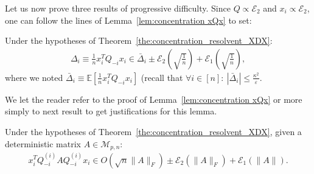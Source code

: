 \documentclass[a4papaer, titlepage]{book}
\begin{document}
Let us now prove three results of progressive difficulty.
Since $Q \propto \mathcal E_2$ and $x_i \propto \mathcal E_2$, one can follow the lines of Lemma~\ref{lem:concentration xQx} to set:
\begin{lemma}\label{lem:COncentration_xQy}
   Under the hypotheses of Theorem~\ref{the:concentration_resolvent_XDX}:
   \begin{align*}
     \Delta_i \equiv \frac{1}{n}x_i^TQ_{-i}x_i  \in \bar \Delta_i   \pm 
     \mathcal E_2 \left(\sqrt{\frac{1}{n}}\right) + \mathcal E_1 \left(\sqrt{\frac{1}{n}}\right),
   \end{align*}
   where we noted $\bar \Delta_i \equiv \mathbb E[\frac{1}{n}x_i^TQ_{-i}x_i]$ (recall that $\forall i\in[n]: \ |\bar \Delta_i| \leq \frac{\kappa^2}{\varepsilon}$.
 \end{lemma}
 We let the reader refer to the proof of Lemma~\ref{lem:concentration xQx} or more simply to next result to get justifications for this lemma.
\begin{lemma}\label{lem:concentration_xiQAQyi}
Under the hypotheses of Theorem~\ref{the:concentration_resolvent_XDX}, given a deterministic matrix $A \in \mathcal M_{p,n}$:
  \begin{align*}
     x_i^TQ_{-i}^{(i)}AQ_{-i}^{(i)}x_i  \in O(\sqrt n \|A\|_F) \pm \mathcal E_2(\|A\|_F) + \mathcal E_1(\|A\|).
  \end{align*}
\end{lemma}
\end{document}
